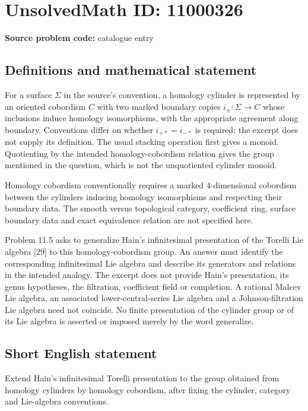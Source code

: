 \documentclass[11pt]{article}
\begin{document}
\section*{UnsolvedMath ID: 11000326}
\textbf{Source problem code:} catalogue entry
\subsection{Definitions and mathematical statement}
For a surface $\Sigma$ in the source's convention, a homology cylinder is represented by an oriented cobordism $C$ with two marked boundary copies $i_\pm:\Sigma\to C$ whose inclusions induce homology isomorphisms, with the appropriate agreement along boundary. Conventions differ on whether $i_{+*}=i_{-*}$ is required; the excerpt does not supply its definition. The usual stacking operation first gives a monoid. Quotienting by the intended homology-cobordism relation gives the group mentioned in the question, which is not the unquotiented cylinder monoid.

Homology cobordism conventionally requires a marked $4$-dimensional cobordism between the cylinders inducing homology isomorphisms and respecting their boundary data. The smooth versus topological category, coefficient ring, surface boundary data and exact equivalence relation are not specified here.

Problem 11.5 asks to generalize Hain's infinitesimal presentation of the Torelli Lie algebra [29] to this homology-cobordism group. An answer must identify the corresponding infinitesimal Lie algebra and describe its generators and relations in the intended analogy. The excerpt does not provide Hain's presentation, its genus hypotheses, the filtration, coefficient field or completion. A rational Malcev Lie algebra, an associated lower-central-series Lie algebra and a Johnson-filtration Lie algebra need not coincide. No finite presentation of the cylinder group or of its Lie algebra is asserted or imposed merely by the word generalize.
\subsection{Short English statement}
Extend Hain's infinitesimal Torelli presentation to the group obtained from homology cylinders by homology cobordism, after fixing the cylinder, category and Lie-algebra conventions.
\end{document}
